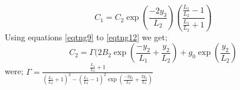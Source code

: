 \begin{equation}
\label{eqtn:eq022}
C_1 = C_2\exp \left( \frac{-2y_3}{L_2}\right)\left( \frac{\frac{L_1}{L_2}-1}{\frac{L_1}{L_2}+1}\right)
\end{equation}
Using equations \ref{eqtng9} to \ref{eqtng12} we get;
\begin{equation}
C_2 = \Gamma(2B_2\exp \left( \frac{-y_2}{L_1}+\frac{y_2}{L_2}\right) + g_0\exp \left( \frac{y_2}{L_2}\right)
\end{equation}
were;
$\Gamma = \frac{\frac{L_1}{L_2}+ 1}{\left(\frac{L_1}{L_2}+1\right)^2 - \left(\frac{L_1}{L_2}-1\right)^2{\exp \left(\frac{-2y_3}{L_2} +\frac{2y_2}{L_2} \right)}}$








\